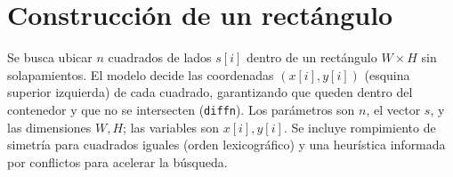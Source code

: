 
\section{Construcción de un rectángulo}\label{sec:06-rectangulo}
Se busca ubicar \(n\) cuadrados de lados \(s[i]\) dentro de un rectángulo \(W\times H\) sin solapamientos. El modelo decide las coordenadas \((x[i],y[i])\) (esquina superior izquierda) de cada cuadrado, garantizando que queden dentro del contenedor y que no se intersecten (\texttt{diffn}). Los parámetros son \(n\), el vector \(s\), y las dimensiones \(W,H\); las variables son \(x[i],y[i]\). Se incluye rompimiento de simetría para cuadrados iguales (orden lexicográfico) y una heurística informada por conflictos para acelerar la búsqueda.